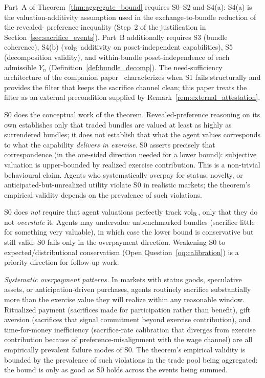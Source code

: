 Part~A of Theorem~\ref{thm:aggregate_bound} requires
S0--S2 and S4(a): S4(a) is the valuation-additivity assumption
used in the exchange-to-bundle reduction of the revealed-
preference inequality (Step~2 of the justification in
Section~\ref{sec:sacrifice_events}).
Part~B additionally requires S3 (bundle coherence), S4(b)
(${\operatorname{vol}_{\mathrm{R}}}$ additivity on poset-independent capabilities), S5
(decomposition validity), and within-bundle poset-independence
of each admissible $Y_n$ (Definition~\ref{def:bundle_decomp}).
The need-sufficiency architecture of the companion
paper~\citep[Need~Sufficiency]{lasser2026paper8b} characterizes when S1 fails
structurally and provides the filter that keeps the sacrifice
channel clean; this paper treats the filter as an external
precondition supplied by Remark~\ref{rem:external_attestation}.

\begin{remark}
\label{rem:s0_substantive}
S0 does the conceptual work of the theorem.  Revealed-preference
reasoning on its own establishes only that traded bundles are
valued at least as highly as surrendered bundles; it does not
establish that what the agent values corresponds to what the
capability \emph{delivers in exercise}.  S0 asserts precisely
that correspondence (in the one-sided direction needed for a
lower bound): subjective valuation is upper-bounded by realized
exercise contribution.  This is a non-trivial behavioural claim.
Agents who systematically overpay for status, novelty, or
anticipated-but-unrealized utility violate S0 in realistic
markets; the theorem's empirical validity depends on the
prevalence of such violations.

S0 does \emph{not} require that agent valuations perfectly track
${\operatorname{vol}_{\mathrm{R}}}$, only that they do not \emph{overstate} it.  Agents may
undervalue unbenchmarked bundles (sacrifice little for something
very valuable), in which case the lower bound is conservative
but still valid.  S0 fails only in the overpayment direction.
Weakening S0 to expected/distributional conservatism
(Open Question~\ref{oq:calibration}) is a priority direction for
follow-up work.

\emph{Systematic overpayment patterns.}  In markets with status
goods, speculative assets, or anticipation-driven purchases,
agents routinely sacrifice substantially more than the
exercise value they will realize within any reasonable window.
Ritualized payment (sacrifices made for participation rather
than benefit), gift aversion (sacrifices that signal commitment
beyond exercise contribution), and time-for-money inefficiency
(sacrifice-rate calibration that diverges from exercise
contribution because of preference-misalignment with the wage
channel) are all empirically prevalent failure modes of S0.
The theorem's empirical validity is bounded by the
prevalence of such violations in the trade pool being aggregated:
the bound is only as good as S0 holds across the events being
summed.


\end{remark}
